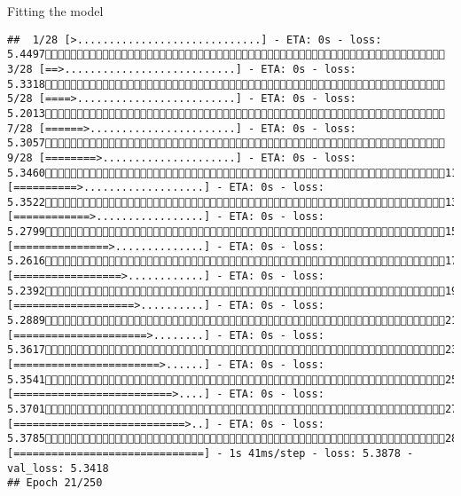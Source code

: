 \documentclass[
  ignorenonframetext,
]{beamer}
\begin{document}
\begin{frame}[fragile]{Fitting the model}
\begin{verbatim}
##  1/28 [>.............................] - ETA: 0s - loss: 5.4497 3/28 [==>...........................] - ETA: 0s - loss: 5.3318 5/28 [====>.........................] - ETA: 0s - loss: 5.2013 7/28 [======>.......................] - ETA: 0s - loss: 5.3057 9/28 [========>.....................] - ETA: 0s - loss: 5.346011/28 [==========>...................] - ETA: 0s - loss: 5.352213/28 [============>.................] - ETA: 0s - loss: 5.279915/28 [===============>..............] - ETA: 0s - loss: 5.261617/28 [=================>............] - ETA: 0s - loss: 5.239219/28 [===================>..........] - ETA: 0s - loss: 5.288921/28 [=====================>........] - ETA: 0s - loss: 5.361723/28 [=======================>......] - ETA: 0s - loss: 5.354125/28 [=========================>....] - ETA: 0s - loss: 5.370127/28 [===========================>..] - ETA: 0s - loss: 5.378528/28 [==============================] - 1s 41ms/step - loss: 5.3878 - val_loss: 5.3418
## Epoch 21/250

\end{verbatim}
\end{frame}
\end{document}
